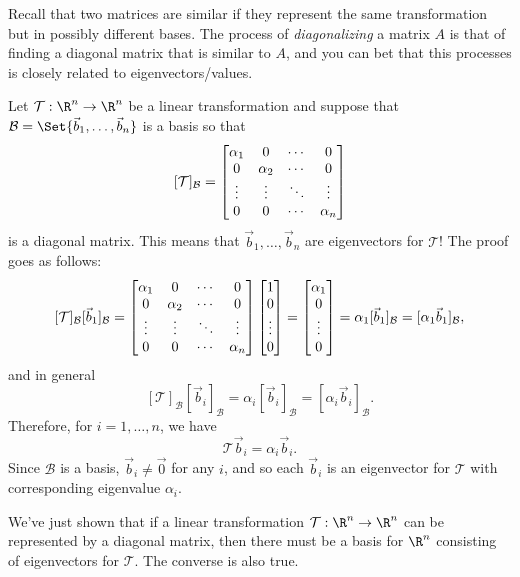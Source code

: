 Recall that two matrices are similar if they represent the same transformation but in possibly different bases.
The process of \emph{diagonalizing} a matrix $A$ is that of finding a diagonal matrix that is similar to $A$,
and you can bet that this processes is closely related to eigenvectors/values.

Let $\mathcal T:\R^n\to\R^n$ be a linear transformation and suppose that $\mathcal B=\Set{\vec b_1,\ldots,\vec b_n}$
is a basis so that
\[
	[\mathcal T]_{\mathcal B} = \begin{bmatrix}\alpha_1&0&\cdots &0\\0&\alpha_2&\cdots &0\\\vdots&\vdots&\ddots&\vdots\\0&0&\cdots&\alpha_n\end{bmatrix}
\]
is a diagonal matrix. This means that $\vec b_1,\ldots,\vec b_n$ are eigenvectors for $\mathcal T$! The proof goes as follows:
\[
	[\mathcal T]_{\mathcal B}[\vec b_1]_{\mathcal B} = 
	\begin{bmatrix}\alpha_1&0&\cdots &0\\0&\alpha_2&\cdots &0\\\vdots&\vdots&\ddots&\vdots\\0&0&\cdots&\alpha_n\end{bmatrix}
	\begin{bmatrix}1\\0\\\vdots\\0\end{bmatrix} = \begin{bmatrix}\alpha_1\\0\\\vdots\\0\end{bmatrix}=\alpha_1[\vec b_1]_{\mathcal B}=[\alpha_1\vec b_1]_{\mathcal B},
\]
and in general
\[
	[\mathcal T]_{\mathcal B}[\vec b_i]_{\mathcal B} = \alpha_i[\vec b_i]_{\mathcal B}=[\alpha_i\vec b_i]_{\mathcal B}.
\]
Therefore, for $i=1,\ldots,n$, we have
\[
	\mathcal T\vec b_i=\alpha_i\vec b_i.
\]
Since $\mathcal B$ is a basis, $\vec b_i\neq \vec 0$ for any $i$, and so each $\vec b_i$ is an eigenvector for $\mathcal T$ with
corresponding eigenvalue $\alpha_i$.

We've just shown that if a linear transformation $\mathcal T:\R^n\to\R^n$ can be represented by a diagonal matrix,
then there must be a basis for $\R^n$ consisting of eigenvectors for $\mathcal T$. The converse is also true.

